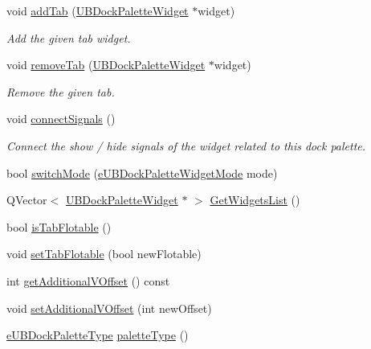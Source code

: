 \begin{DoxyCompactItemize}
void \hyperlink{class_u_b_dock_palette_a3adce127d2cae21c3165968ed8133076}{add\-Tab} (\hyperlink{class_u_b_dock_palette_widget}{U\-B\-Dock\-Palette\-Widget} $\ast$widget)
\begin{DoxyCompactList}\small\item\em Add the given tab widget. \end{DoxyCompactList}\item 
void \hyperlink{class_u_b_dock_palette_a70de660848735ee7598b56f9bfc0c27f}{remove\-Tab} (\hyperlink{class_u_b_dock_palette_widget}{U\-B\-Dock\-Palette\-Widget} $\ast$widget)
\begin{DoxyCompactList}\small\item\em Remove the given tab. \end{DoxyCompactList}\item 
void \hyperlink{class_u_b_dock_palette_a2e83c77ca0f51d58207dedd68ae6118c}{connect\-Signals} ()
\begin{DoxyCompactList}\small\item\em Connect the show / hide signals of the widget related to this dock palette. \end{DoxyCompactList}\item 
bool \hyperlink{class_u_b_dock_palette_a6e4d5f85e28f73801dd029bf8a2f2057}{switch\-Mode} (\hyperlink{_u_b_dock_palette_widget_8h_af3b2828ed1bf91ad13c73e4e1b3b529e}{e\-U\-B\-Dock\-Palette\-Widget\-Mode} mode)
\item 
Q\-Vector$<$ \hyperlink{class_u_b_dock_palette_widget}{U\-B\-Dock\-Palette\-Widget} $\ast$ $>$ \hyperlink{class_u_b_dock_palette_ade4343698d6fa41beff740b463567a5b}{Get\-Widgets\-List} ()
\item 
bool \hyperlink{class_u_b_dock_palette_a76cddc8a98e62f21b76b28fff4bfe4b7}{is\-Tab\-Flotable} ()
\item 
void \hyperlink{class_u_b_dock_palette_a487670e4ef23ef3b952d739b950b0678}{set\-Tab\-Flotable} (bool new\-Flotable)
\item 
int \hyperlink{class_u_b_dock_palette_a3363a37bac14ae062b1332592c6e73e0}{get\-Additional\-V\-Offset} () const 
\item 
void \hyperlink{class_u_b_dock_palette_ade119d468cff7b36ca1cb63fb22172fa}{set\-Additional\-V\-Offset} (int new\-Offset)
\item 
\hyperlink{_u_b_dock_palette_8h_a63e99c0675ae955b642f5e77e3070053}{e\-U\-B\-Dock\-Palette\-Type} \hyperlink{class_u_b_dock_palette_a51cb7edc01ac73cee66f66ae6788aebb}{palette\-Type} ()
\end{DoxyCompactItemize}
